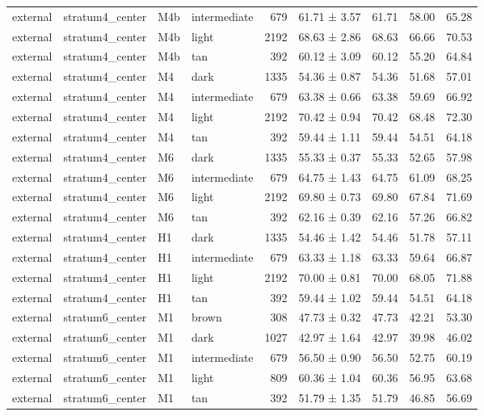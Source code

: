 \begin{tabular}{llllrlrrr}
external & stratum4\_center & M4b & intermediate & 679 & 61.71 ± 3.57 & 61.71 & 58.00 & 65.28 \\
external & stratum4\_center & M4b & light & 2192 & 68.63 ± 2.86 & 68.63 & 66.66 & 70.53 \\
external & stratum4\_center & M4b & tan & 392 & 60.12 ± 3.09 & 60.12 & 55.20 & 64.84 \\
external & stratum4\_center & M4 & dark & 1335 & 54.36 ± 0.87 & 54.36 & 51.68 & 57.01 \\
external & stratum4\_center & M4 & intermediate & 679 & 63.38 ± 0.66 & 63.38 & 59.69 & 66.92 \\
external & stratum4\_center & M4 & light & 2192 & 70.42 ± 0.94 & 70.42 & 68.48 & 72.30 \\
external & stratum4\_center & M4 & tan & 392 & 59.44 ± 1.11 & 59.44 & 54.51 & 64.18 \\
external & stratum4\_center & M6 & dark & 1335 & 55.33 ± 0.37 & 55.33 & 52.65 & 57.98 \\
external & stratum4\_center & M6 & intermediate & 679 & 64.75 ± 1.43 & 64.75 & 61.09 & 68.25 \\
external & stratum4\_center & M6 & light & 2192 & 69.80 ± 0.73 & 69.80 & 67.84 & 71.69 \\
external & stratum4\_center & M6 & tan & 392 & 62.16 ± 0.39 & 62.16 & 57.26 & 66.82 \\
external & stratum4\_center & H1 & dark & 1335 & 54.46 ± 1.42 & 54.46 & 51.78 & 57.11 \\
external & stratum4\_center & H1 & intermediate & 679 & 63.33 ± 1.18 & 63.33 & 59.64 & 66.87 \\
external & stratum4\_center & H1 & light & 2192 & 70.00 ± 0.81 & 70.00 & 68.05 & 71.88 \\
external & stratum4\_center & H1 & tan & 392 & 59.44 ± 1.02 & 59.44 & 54.51 & 64.18 \\
external & stratum6\_center & M1 & brown & 308 & 47.73 ± 0.32 & 47.73 & 42.21 & 53.30 \\
external & stratum6\_center & M1 & dark & 1027 & 42.97 ± 1.64 & 42.97 & 39.98 & 46.02 \\
external & stratum6\_center & M1 & intermediate & 679 & 56.50 ± 0.90 & 56.50 & 52.75 & 60.19 \\
external & stratum6\_center & M1 & light & 809 & 60.36 ± 1.04 & 60.36 & 56.95 & 63.68 \\
external & stratum6\_center & M1 & tan & 392 & 51.79 ± 1.35 & 51.79 & 46.85 & 56.69 \\

\end{tabular}
